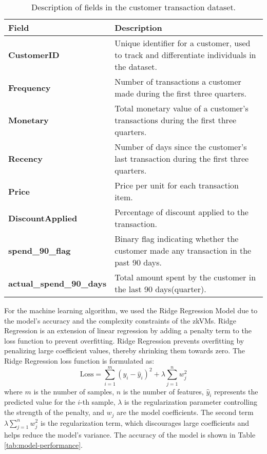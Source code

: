 \documentclass{scrartcl}
\begin{document}
\begin{table}[ht!]
\centering
\begin{tabular}{|l|p{10cm}|}
\hline
\textbf{Field} & \textbf{Description} \\
\hline
\textbf{CustomerID} & Unique identifier for a customer, used to track and differentiate individuals in the dataset. \\
\hline
\textbf{Frequency} & Number of transactions a customer made during the first three quarters. \\
\hline
\textbf{Monetary} & Total monetary value of a customer's transactions during the first three quarters. \\
\hline
\textbf{Recency} & Number of days since the customer's last transaction during the first three quarters. \\
\hline
\textbf{Price} & Price per unit for each transaction item. \\
\hline
\textbf{DiscountApplied} & Percentage of discount applied to the transaction. \\
\hline
\textbf{spend\_90\_flag} & Binary flag indicating whether the customer made any transaction in the past 90 days. \\
\hline
\textbf{actual\_spend\_90\_days} & Total amount spent by the customer in the last 90 days(quarter). \\
\hline
\end{tabular}
\caption{Description of fields in the customer transaction dataset.}
\label{tab:dataset_description}
\end{table}

For the machine learning algorithm, we used the Ridge Regression Model due to the model's accuracy and the complexity constraints of the zkVMs. Ridge Regression is an extension of linear regression by adding a penalty term to the loss function to prevent overfitting.  Ridge Regression prevents overfitting by penalizing large coefficient values, thereby shrinking them towards zero. The Ridge Regression loss function is formulated as:
\[
\text{Loss} = \sum_{i=1}^{m} \left( y_i - \hat{y}_i \right)^2 + \lambda \sum_{j=1}^{n} w_j^2
\]
where \( m \) is the number of samples, \( n \) is the number of features, \( \hat{y}_i \) represents the predicted value for the \( i \)-th sample, \( \lambda \) is the regularization parameter controlling the strength of the penalty, and \( w_j \) are the model coefficients. The second term \( \lambda \sum_{j=1}^{n} w_j^2 \) is the regularization term, which discourages large coefficients and helps reduce the model's variance. The accuracy of the model is shown in Table \ref{tab:model-performance}.
\end{document}
